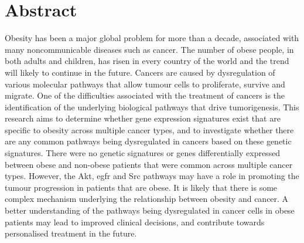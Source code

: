\vspace*{\fill}

\section*{\centering Abstract}

Obesity has been a major global problem for more than a decade, associated with many noncommunicable diseases such as  cancer.
The number of obese people, in both adults and children, has risen in every country of the world and the trend will likely to continue in the future.
Cancers are caused by dysregulation of various molecular pathways that allow tumour cells to proliferate, survive and migrate.
One of the difficulties associated with the treatment of cancers is the identification of the underlying biological pathways that drive tumorigenesis.
This research aims to determine whether gene expression signatures exist  that are specific to obesity across multiple cancer types, and to investigate whether there are any common pathways being dysregulated in cancers based on these genetic signatures.
There were no genetic signatures or genes differentially expressed between obese and non-obese patients that were common across multiple cancer types.
However, the Akt, \gls{egfr} and Src pathways may have a role in promoting the tumour progression in patients that are obese.
It is likely that there is some complex mechanism underlying the relationship between obesity and cancer.
A better understanding of the pathways being dysregulated in cancer cells in obese patients may lead to improved clinical decisions, and contribute towards personalised treatment in the future.

\vfill
